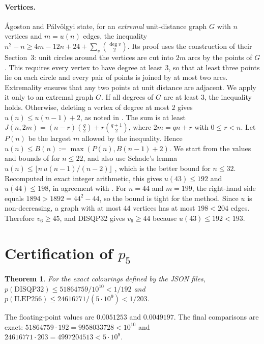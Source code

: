 \documentclass[10pt,a4paper]{article}
\newtheorem{theorem}{Theorem}
\begin{document}
\paragraph{Vertices.} \'Agoston and P\'alv\"olgyi \cite[Prop.~12]{AP} state, for an \emph{extremal}
unit-distance graph $G$ with $n$ vertices and $m=u(n)$ edges, the inequality
$n^2-n\ge 4m-12n+24+\sum_v\binom{\deg v}{2}$. Its proof uses the construction of their Section~3:
unit circles around the vertices are cut into $2m$ arcs by the points of $G$. This requires every
vertex to have degree at least $3$, so that at least three points lie on each circle and every pair
of points is joined by at most two arcs. Extremality ensures that any two points at unit distance are
adjacent. We apply it only to an extremal graph $G$. If all degrees of $G$ are at least $3$, the
inequality holds. Otherwise, deleting a vertex of degree at most $2$ gives $u(n)\le u(n-1)+2$, as
noted in \cite[note~6, p.~12]{AP}. The sum is at least
$J(n,2m)=(n-r)\binom{q}{2}+r\binom{q+1}{2}$, where $2m=qn+r$ with $0\le r<n$. Let $P(n)$ be the
largest $m$ allowed by the inequality. Hence $u(n)\le B(n):=\max(P(n),B(n-1)+2)$. We start from the values and bounds of
\cite{AMP} for $n\le22$, and also use Schade's lemma $u(n)\le\lfloor n\,u(n-1)/(n-2)\rfloor$
\cite[Lemma~2]{AMP}, which is the better bound for $n\le32$. Recomputed in exact integer
arithmetic, this gives $u(43)\le192$ and $u(44)\le198$, in agreement with \cite[note~3]{dGP}. For
$n=44$ and $m=199$, the right-hand side equals $1894>1892=44^2-44$, so the bound is tight for the
method. Since $u$ is non-decreasing, a graph with at most $44$ vertices has at most $198<204$
edges. Therefore $v_6\ge45$, and DISQP32 gives $v_6\ge44$ because $u(43)\le192<193$.

\section{Certification of \texorpdfstring{$p_5$}{p5}}

\begin{theorem}\label{thm:cert}
For the exact colourings defined by the JSON files,
$p(\mathrm{DISQP32})\le 51864759/10^{10}<1/192$ and
$p(\mathrm{ILEP256})\le 24616771/(5\cdot10^9)<1/203$.
\end{theorem}

The floating-point values are $0.0051253$ and $0.0049197$. The final comparisons are exact:
$51864759\cdot192=9958033728<10^{10}$ and $24616771\cdot203=4997204513<5\cdot10^9$.
\end{document}
